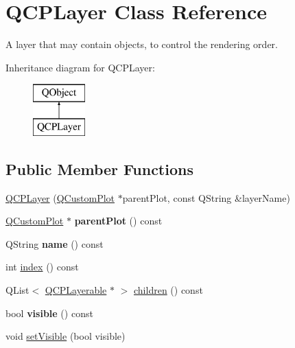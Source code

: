 \hypertarget{class_q_c_p_layer}{}\section{Q\+C\+P\+Layer Class Reference}
\label{class_q_c_p_layer}


A layer that may contain objects, to control the rendering order.  


Inheritance diagram for Q\+C\+P\+Layer\+:\begin{figure}[H]
\begin{center}
\leavevmode
\includegraphics[height=2.000000cm]{class_q_c_p_layer}
\end{center}
\end{figure}
\subsection*{Public Member Functions}
\begin{DoxyCompactItemize}
\item 
\mbox{\hyperlink{class_q_c_p_layer_a5d0657fc86d624e5efbe930ef21af718}{Q\+C\+P\+Layer}} (\mbox{\hyperlink{class_q_custom_plot}{Q\+Custom\+Plot}} $\ast$parent\+Plot, const Q\+String \&layer\+Name)
\item 
\mbox{\label{class_q_c_p_layer_a5520019787482e13857ebe631c27c3fa}} 
\mbox{\hyperlink{class_q_custom_plot}{Q\+Custom\+Plot}} $\ast$ {\bfseries parent\+Plot} () const
\item 
\mbox{\label{class_q_c_p_layer_a37806f662b50b588fb1029a14fc5ef50}} 
Q\+String {\bfseries name} () const
\item 
int \mbox{\hyperlink{class_q_c_p_layer_ad322905c4700dcc7ceba63e011c730d2}{index}} () const
\item 
Q\+List$<$ \mbox{\hyperlink{class_q_c_p_layerable}{Q\+C\+P\+Layerable}} $\ast$ $>$ \mbox{\hyperlink{class_q_c_p_layer_a183b90941fc78f0b136edd77c5fb6966}{children}} () const
\item 
\mbox{\label{class_q_c_p_layer_ad1cc2d6b32d2abb33c7f449b964e068c}} 
bool {\bfseries visible} () const
\item 
void \mbox{\hyperlink{class_q_c_p_layer_ac07671f74edf6884b51a82afb2c19516}{set\+Visible}} (bool visible)
\end{DoxyCompactItemize}
